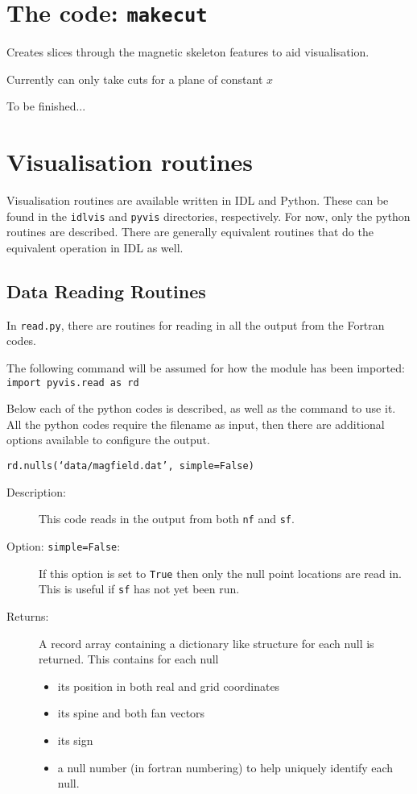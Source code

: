 \documentclass[12pt]{article}
\begin{document}
  \section{The code: \texttt{makecut}}

    Creates slices through the magnetic skeleton features to aid visualisation.

    Currently can only take cuts for a plane of constant \( x \)

    To be finished...

  \section{Visualisation routines}
    \label{sec:vis}

    Visualisation routines are available written in IDL and Python. These can be found in the \texttt{idlvis} and \texttt{pyvis} directories, respectively. For now, only the python routines are described. There are generally equivalent routines that do the equivalent operation in IDL as well.

    \subsection{Data Reading Routines}

      In \texttt{read.py}, there are routines for reading in all the output from the Fortran codes.

      The following command will be assumed for how the module has been imported:
      \texttt{import pyvis.read as rd}

      Below each of the python codes is described, as well as the command to use it. All the python codes require the filename as input, then there are additional options available to configure the output.

      \texttt{rd.nulls(`data/magfield.dat', simple=False)}

      \begin{description}
        \item [Description:] This code reads in the output from both \texttt{nf} and \texttt{sf}.
        \item [Option: \texttt{simple=False}:] If this option is set to \texttt{True} then only the null point locations are read in. This is useful if \texttt{sf} has not yet been run.
        \item [Returns:] A record array containing a dictionary like structure for each null is returned. This contains for each null
        \begin{itemize}
          \item its position in both real and grid coordinates
          \item its spine and both fan vectors
          \item its sign
          \item a null number (in fortran numbering) to help uniquely identify each null.
        \end{itemize}
      \end{description}
\end{document}
